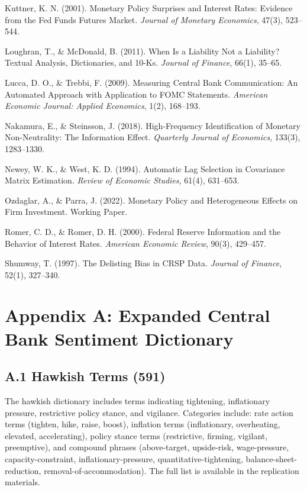 \documentclass[12pt]{article}
\begin{document}
Kuttner, K. N. (2001). Monetary Policy Surprises and Interest Rates: Evidence from the Fed Funds Futures Market. \textit{Journal of Monetary Economics}, 47(3), 523--544.

Loughran, T., \& McDonald, B. (2011). When Is a Liability Not a Liability? Textual Analysis, Dictionaries, and 10-Ks. \textit{Journal of Finance}, 66(1), 35--65.

Lucca, D. O., \& Trebbi, F. (2009). Measuring Central Bank Communication: An Automated Approach with Application to FOMC Statements. \textit{American Economic Journal: Applied Economics}, 1(2), 168--193.

Nakamura, E., \& Steinsson, J. (2018). High-Frequency Identification of Monetary Non-Neutrality: The Information Effect. \textit{Quarterly Journal of Economics}, 133(3), 1283--1330.

Newey, W. K., \& West, K. D. (1994). Automatic Lag Selection in Covariance Matrix Estimation. \textit{Review of Economic Studies}, 61(4), 631--653.

Ozdaglar, A., \& Parra, J. (2022). Monetary Policy and Heterogeneous Effects on Firm Investment. Working Paper.

Romer, C. D., \& Romer, D. H. (2000). Federal Reserve Information and the Behavior of Interest Rates. \textit{American Economic Review}, 90(3), 429--457.

Shumway, T. (1997). The Delisting Bias in CRSP Data. \textit{Journal of Finance}, 52(1), 327--340.


\section{Appendix A: Expanded Central Bank Sentiment Dictionary}

\subsection{A.1 Hawkish Terms (591)}

The hawkish dictionary includes terms indicating tightening, inflationary pressure, restrictive policy stance, and vigilance. Categories include: rate action terms (tighten, hike, raise, boost), inflation terms (inflationary, overheating, elevated, accelerating), policy stance terms (restrictive, firming, vigilant, preemptive), and compound phrases (above-target, upside-risk, wage-pressure, capacity-constraint, inflationary-pressure, quantitative-tightening, balance-sheet-reduction, removal-of-accommodation). The full list is available in the replication materials.
\end{document}
